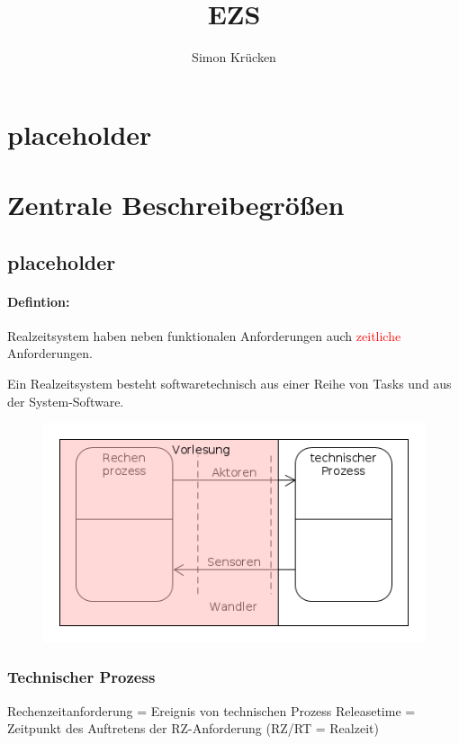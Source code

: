 \documentclass[12pt,a4paper,oneside,ngerman]{article}
\title{EZS}
\author{Simon Krücken}
\begin{document}
    
\begin{titlepage}
\end{titlepage}
\tableofcontents
\pagebreak

\section[placeholder]{placeholder}
\section[Zentrale Beschreibegrößen]{Zentrale Beschreibegrößen}
\subsection{placeholder}

\paragraph[Defintion]{Defintion:}
Realzeitsystem haben neben funktionalen Anforderungen auch \textcolor{red}{zeitliche} Anforderungen.

Ein Realzeitsystem besteht softwaretechnisch aus einer Reihe von Tasks und aus der System-Software.

\begin{figure}[ht]
	\centering
	\includegraphics[scale=0.5]{umlet/rt_control.png}
\end{figure}

\subsubsection{Technischer Prozess}
Rechenzeitanforderung = Ereignis von technischen Prozess
Releasetime = Zeitpunkt des Auftretens der RZ-Anforderung (RZ/RT = Realzeit)
\end{document}

